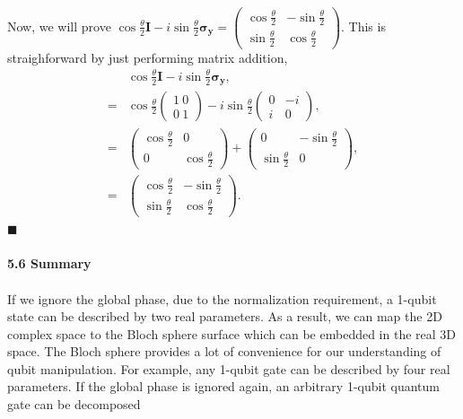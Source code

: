 \documentclass{article}
\begin{document}
Now, we will prove $\cos{\frac{\theta}{2}}\boldsymbol{I}-i\sin{\frac{\theta}{2}}\boldsymbol{\sigma_y}=\begin{pmatrix}
    \cos{\frac{\theta}{2}}& -\sin{\frac{\theta}{2}}\\
    \sin{\frac{\theta}{2}}& \cos{\frac{\theta}{2}}
\end{pmatrix}$. This is straighforward by just performing matrix addition,
\begin{align*}\label{eq 5.33}
    &\cos{\frac{\theta}{2}}\boldsymbol{I}-i\sin{\frac{\theta}{2}}\boldsymbol{\sigma_y},\\
    =&\cos{\frac{\theta}{2}}\begin{pmatrix}
        1\ 0\\ 0\ 1
    \end{pmatrix}-
    i\sin{\frac{\theta}{2}}\begin{pmatrix}
        0& -i\\ i& 0
    \end{pmatrix},\\
    =&\begin{pmatrix}
        \cos{\frac{\theta}{2}}&0\\0&\cos{\frac{\theta}{2}}
    \end{pmatrix}+
    \begin{pmatrix}
        0& -\sin{\frac{\theta}{2}}\\ \sin{\frac{\theta}{2}}&0
    \end{pmatrix},\\
    =&\begin{pmatrix}
        \cos{\frac{\theta}{2}} & -\sin{\frac{\theta}{2}}\\
        \sin{\frac{\theta}{2}} & \cos{\frac{\theta}{2}}
    \end{pmatrix}. \tag{5.33}
\end{align*}
\hfill $\blacksquare$\\\\
\textbf{\large 5.6 Summary}\\\\
If we ignore the global phase, due to the normalization requirement,
a 1-qubit state can be described by two real parameters. As a result, we can
map the 2D complex space to the Bloch sphere surface which can be embedded in the real 
3D space. The Bloch sphere provides a lot of convenience for our understanding of qubit manipulation.
For example, any 1-qubit gate can be described by four real parameters. If the global
phase is ignored again, an arbitrary 1-qubit quantum gate can be decomposed
\end{document}

